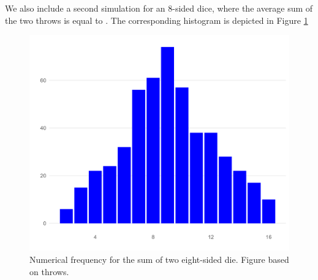 \documentclass[12pt]{article}
\theoremstyle{definition}
\begin{document}
We also include a second simulation for an 8-sided dice, where the average sum of the two throws is equal to \unskip. The corresponding histogram is depicted in Figure \ref{fig:hist_500_8} 
\begin{figure}[tbh!]
\centering
\includegraphics[width=.8\linewidth]{plot/500_8/hist.png}
\caption[]{Numerical frequency for the sum of two eight-sided die. Figure based on throws.}
\label{fig:hist_500_8}
\end{figure}

\newpage
\end{document}

